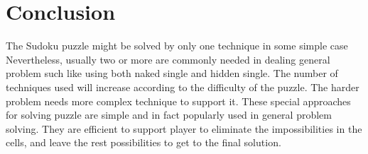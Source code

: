 \documentclass[11pt]{report}
\begin{document}
\chapter{Conclusion}
\label{cha:Conclusion}
The Sudoku puzzle might be solved by only one technique in some simple case Nevertheless, usually two or more are commonly needed in dealing general problem such like using both naked single and hidden single. The number of techniques used will increase according to the difficulty of the puzzle. The harder problem needs more complex technique to support it.
These special approaches for solving puzzle are simple and in fact popularly used in general problem solving. They are efficient to support player to eliminate the impossibilities in the cells, and leave the rest possibilities to get to the final solution.





\end{document}
